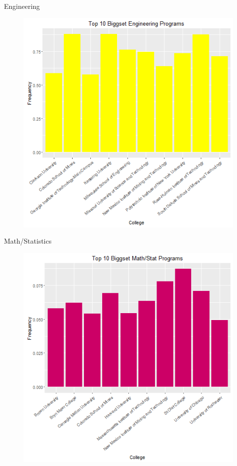\documentclass{article}
\begin{document}
Engineering
\begin{figure}[h!]
\includegraphics{../images/biggestEngineering.png}
\end{figure}


Math/Statistics
\begin{figure}[h!]
\includegraphics{../images/biggestMathStat.png}
\end{figure}
\end{document}
